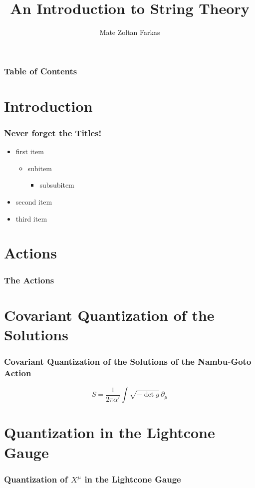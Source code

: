 \documentclass[11pt,aspectratio=169]{beamer}
\begin{document}
	
	\author{Mate Zoltan Farkas}
	\title{An Introduction to String Theory}
	
	\begin{frame}[plain]
		\maketitle
	\end{frame}
	
	\begin{frame}
		\frametitle{Table of Contents}
		\tableofcontents
	\end{frame}

	\section{Introduction}
	
	\begin{frame}
		\frametitle{Never forget the Titles!}
		\begin{itemize}[]
			\item<1,2,3,4,5>first item
				\begin{itemize}
					\item<2,3,4,5> subitem
					\begin{itemize}
						\item<3,4,5> subsubitem
					\end{itemize}
				\end{itemize}
			\item<4,5>second item
			\item<5>third item
		\end{itemize}	
	\end{frame}

	\section{Actions}
	
	\begin{frame}
		\frametitle{The Actions}
	\end{frame}

	\section{Covariant Quantization of the Solutions}
	
	\begin{frame}
		\frametitle{Covariant Quantization of the Solutions of the Nambu-Goto Action}
		
		\begin{equation}
			S = \frac{1}{2\pi\alpha'}\int\sqrt{-\det g} \, \partial_\mu
		\end{equation}
	
	\end{frame}	

	\section{Quantization in the Lightcone Gauge}
	
	\begin{frame}
		\frametitle{Quantization of $X^\mu$ in the Lightcone Gauge}
	\end{frame}
\end{document}
